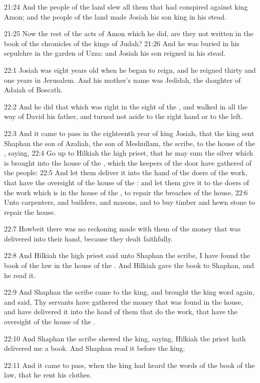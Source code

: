 21:24 And the people of the land slew all them that had conspired
against king Amon; and the people of the land made Josiah his son king
in his stead.

21:25 Now the rest of the acts of Amon which he did, are they not
written in the book of the chronicles of the kings of Judah?  21:26
And he was buried in his sepulchre in the garden of Uzza: and Josiah
his son reigned in his stead.

22:1 Josiah was eight years old when he began to reign, and he reigned
thirty and one years in Jerusalem. And his mother's name was Jedidah,
the daughter of Adaiah of Boscath.

22:2 And he did that which was right in the sight of the \LORD, and
walked in all the way of David his father, and turned not aside to the
right hand or to the left.

22:3 And it came to pass in the eighteenth year of king Josiah, that
the king sent Shaphan the son of Azaliah, the son of Meshullam, the
scribe, to the house of the \LORD, saying, 22:4 Go up to Hilkiah the
high priest, that he may sum the silver which is brought into the
house of the \LORD, which the keepers of the door have gathered of the
people: 22:5 And let them deliver it into the hand of the doers of the
work, that have the oversight of the house of the \LORD: and let them
give it to the doers of the work which is in the house of the \LORD, to
repair the breaches of the house, 22:6 Unto carpenters, and builders,
and masons, and to buy timber and hewn stone to repair the house.

22:7 Howbeit there was no reckoning made with them of the money that
was delivered into their hand, because they dealt faithfully.

22:8 And Hilkiah the high priest said unto Shaphan the scribe, I have
found the book of the law in the house of the \LORD. And Hilkiah gave
the book to Shaphan, and he read it.

22:9 And Shaphan the scribe came to the king, and brought the king
word again, and said, Thy servants have gathered the money that was
found in the house, and have delivered it into the hand of them that
do the work, that have the oversight of the house of the \LORD.

22:10 And Shaphan the scribe shewed the king, saying, Hilkiah the
priest hath delivered me a book. And Shaphan read it before the king.

22:11 And it came to pass, when the king had heard the words of the
book of the law, that he rent his clothes.

